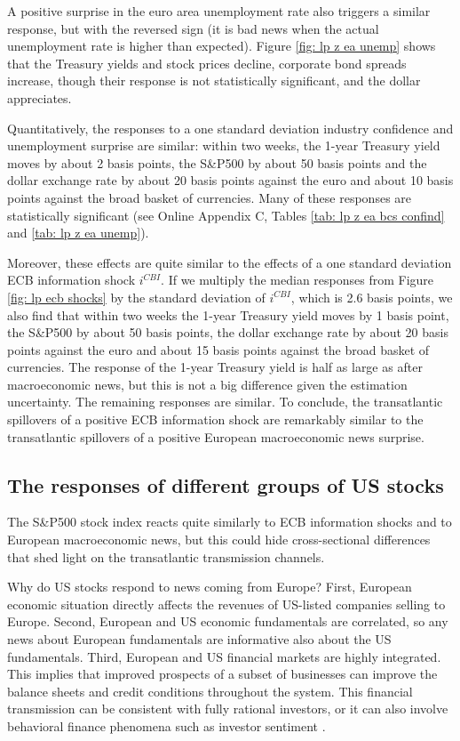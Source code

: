 \documentclass[a4paper,12pt]{article}
\begin{document}
A positive surprise in the euro area unemployment rate also triggers a similar response, but
with the reversed sign (it is bad news when the actual unemployment rate is higher than expected).
Figure \ref{fig: lp z ea unemp} shows that the
Treasury yields and stock prices decline, corporate bond spreads increase, though their
response is not statistically significant, and the dollar appreciates.

Quantitatively, the responses to a one standard deviation industry confidence and unemployment
surprise are similar: within two weeks, the 1-year Treasury yield moves by about 2 basis points,
the S\&P500 by about 50 basis points and the dollar exchange rate by about 20 basis points
against the euro and about 10 basis points against the broad basket of currencies.
Many of these responses are statistically significant (see Online Appendix C, Tables \ref{tab: lp z ea bcs confind} and \ref{tab: lp z ea unemp}).

Moreover, these effects are quite similar to the effects of a one standard deviation ECB information shock $i^{CBI}$.
If we multiply the median responses from Figure \ref{fig: lp ecb shocks} by the standard deviation of $i^{CBI}$, which is 2.6 basis points, we also find that
within two weeks the 1-year Treasury yield moves by 1 basis point,
the S\&P500 by about 50 basis points, the dollar exchange rate by about 20 basis points
against the euro and about 15 basis points against the broad basket of currencies.
The response of the 1-year Treasury yield is half as large as after macroeconomic news,
but this is not a big difference given the estimation uncertainty. The remaining responses are similar.
To conclude, the transatlantic spillovers of a positive ECB information shock are remarkably similar to the transatlantic spillovers of a positive European macroeconomic news surprise.

\subsection{The responses of different groups of US stocks}

The S\&P500 stock index reacts quite similarly to ECB information shocks
and to European macroeconomic news, but this could hide cross-sectional differences
that shed light on the transatlantic transmission channels. 

Why do US stocks respond to news coming from Europe?
First, European economic situation directly affects the revenues of US-listed companies
selling to Europe.
Second, European and US economic fundamentals are correlated,
so any news about European fundamentals are informative also about the US fundamentals. 
Third, European and US financial markets are highly integrated. This implies that improved
prospects of a subset of businesses can improve the balance sheets and credit conditions throughout
the system. This financial transmission can be consistent with fully rational investors,
or it can also involve behavioral finance phenomena such as investor sentiment \citep{Baker_Wurgler_2006}.
\end{document}
